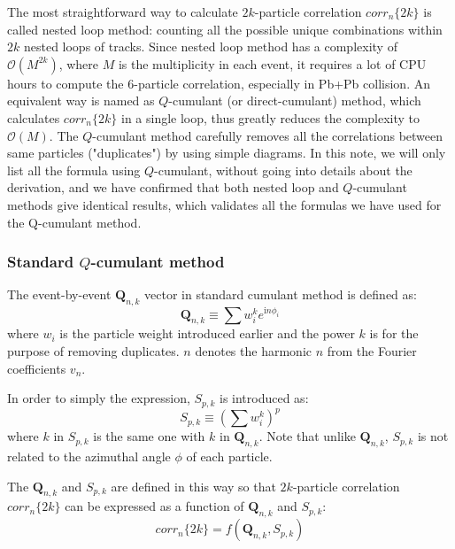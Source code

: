 The most straightforward way to calculate $2k$-particle correlation $corr_n\{2k\}$ is called nested loop method: counting all the possible unique combinations within $2k$ nested loops of tracks. Since nested loop method has a complexity of $\mathcal{O}(M^{2k})$, where $M$ is the multiplicity in each event, it requires a lot of CPU hours to compute the 6-particle correlation, especially in Pb+Pb collision. An equivalent way is named as $Q$-cumulant (or direct-cumulant) method, which calculates $corr_n\{2k\}$ in a single loop, thus greatly reduces the complexity to $\mathcal{O}(M)$. The $Q$-cumulant method carefully removes all the correlations between same particles ("duplicates") by using simple diagrams. In this note, we will only list all the formula using $Q$-cumulant, without going into details about the derivation, and we have confirmed that both nested loop and $Q$-cumulant methods give identical results, which validates all the formulas we have used for the Q-cumulant method.


\subsubsection{Standard $Q$-cumulant method}
The event-by-event $\pmb{Q}_{n,k}$ vector in standard cumulant method is defined as:
\begin{equation}
\pmb{Q}_{n,k}\equiv\sum{w_i^k e^{\text{i}n\phi_i}}
\end{equation}
where $w_i$ is the particle weight introduced earlier and the power $k$ is for the purpose of removing duplicates. $n$ denotes the harmonic $n$ from the Fourier coefficients $v_n$.

In order to simply the expression, $S_{p,k}$ is introduced as:
\begin{equation}
S_{p,k}\equiv(\sum{w_i^k})^{p}
\end{equation}
where $k$ in $S_{p,k}$ is the same one with $k$ in $\pmb{Q}_{n,k}$. Note that unlike $\pmb{Q}_{n,k}$, $S_{p,k}$ is not related to the azimuthal angle $\phi$ of each particle.

The $\pmb{Q}_{n,k}$ and $S_{p,k}$ are defined in this way so that $2k$-particle correlation $corr_n\{2k\}$ can be expressed as a function of $\pmb{Q}_{n,k}$ and $S_{p,k}$:
\begin{equation}
corr_n\{2k\}=f(\pmb{Q}_{n,k},S_{p,k})
\end{equation}

